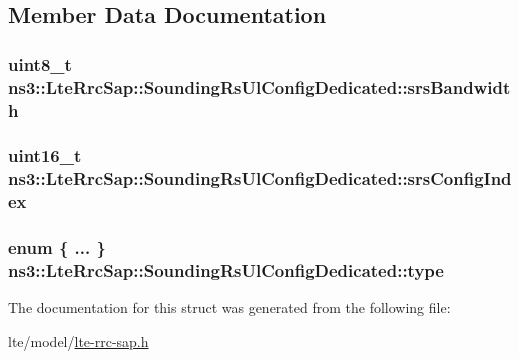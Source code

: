 \subsection{Member Data Documentation}
\subsubsection[{\texorpdfstring{srs\+Bandwidth}{srsBandwidth}}]{\setlength{\rightskip}{0pt plus 5cm}uint8\+\_\+t ns3\+::\+Lte\+Rrc\+Sap\+::\+Sounding\+Rs\+Ul\+Config\+Dedicated\+::srs\+Bandwidth}\hypertarget{structns3_1_1LteRrcSap_1_1SoundingRsUlConfigDedicated_a6623b04421ee665595dd906ee2398648}{}\label{structns3_1_1LteRrcSap_1_1SoundingRsUlConfigDedicated_a6623b04421ee665595dd906ee2398648}
\subsubsection[{\texorpdfstring{srs\+Config\+Index}{srsConfigIndex}}]{\setlength{\rightskip}{0pt plus 5cm}uint16\+\_\+t ns3\+::\+Lte\+Rrc\+Sap\+::\+Sounding\+Rs\+Ul\+Config\+Dedicated\+::srs\+Config\+Index}\hypertarget{structns3_1_1LteRrcSap_1_1SoundingRsUlConfigDedicated_a2cbee1ba9dd47b4b690a8d0e91d209be}{}\label{structns3_1_1LteRrcSap_1_1SoundingRsUlConfigDedicated_a2cbee1ba9dd47b4b690a8d0e91d209be}
\subsubsection[{\texorpdfstring{type}{type}}]{\setlength{\rightskip}{0pt plus 5cm}enum \{ ... \}   ns3\+::\+Lte\+Rrc\+Sap\+::\+Sounding\+Rs\+Ul\+Config\+Dedicated\+::type}\hypertarget{structns3_1_1LteRrcSap_1_1SoundingRsUlConfigDedicated_a81aaa2d0e8fb89ca62ead94f96be175b}{}\label{structns3_1_1LteRrcSap_1_1SoundingRsUlConfigDedicated_a81aaa2d0e8fb89ca62ead94f96be175b}


The documentation for this struct was generated from the following file\+:\begin{DoxyCompactItemize}
\item 
lte/model/\hyperlink{lte-rrc-sap_8h}{lte-\/rrc-\/sap.\+h}\end{DoxyCompactItemize}
